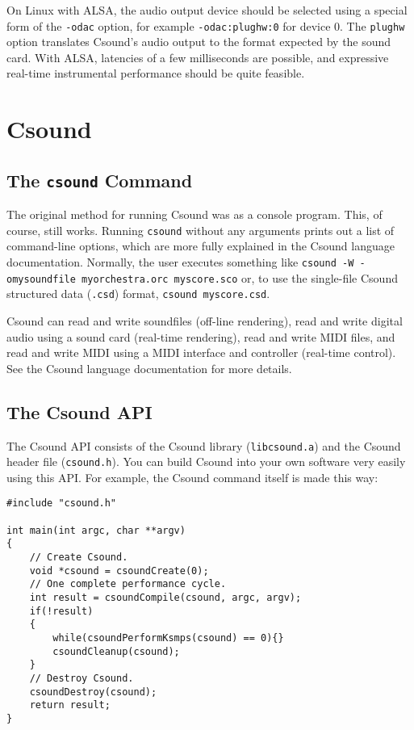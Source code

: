 \documentclass[10pt,letterpaper,onecolumn]{book}
\begin{document}
On Linux with ALSA, the audio output device should be selected using a special form of the \texttt{-odac} option, for example \texttt{-odac:plughw:0} for device 0. The \texttt{plughw} option translates Csound's audio output to the format expected by the sound card. With ALSA, latencies of a few milliseconds are possible, and expressive real-time instrumental performance should be quite feasible.

\section{Csound}

\subsection{The \texttt{csound} Command}

The original method for running Csound was as a console program. This, of course, still works. Running \texttt{csound} without any arguments prints out a list of command-line options, which are more fully explained in the Csound language documentation. Normally, the user executes something like \texttt{csound -W -omysoundfile myorchestra.orc myscore.sco} or, to use the single-file Csound structured data (\texttt{.csd}) format, \texttt{csound myscore.csd}.

Csound can read and write soundfiles (off-line rendering), read and write digital audio using a sound card (real-time rendering), read and write MIDI files, and read and write MIDI using a MIDI interface and controller (real-time control). See the Csound language documentation for more details. 

\subsection{The Csound API}

The Csound API consists of the Csound library (\texttt{libcsound.a}) and the Csound header file (\texttt{csound.h}). You can build Csound into your own software very easily using this API. For example, the Csound command itself is made this way:

\begin{lstlisting}
#include "csound.h"

int main(int argc, char **argv)
{
    // Create Csound.
    void *csound = csoundCreate(0);
    // One complete performance cycle.
    int result = csoundCompile(csound, argc, argv);
    if(!result)
    {
        while(csoundPerformKsmps(csound) == 0){}
        csoundCleanup(csound);
    }
    // Destroy Csound.
    csoundDestroy(csound);
    return result;
}
\end{lstlisting}
\end{document}
